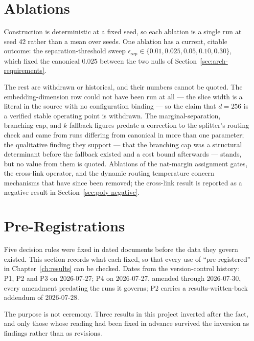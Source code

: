 \section{Ablations}\label{sec:appendix-ablations}

Construction is deterministic at a fixed seed, so each ablation is a single run
at seed 42 rather than a mean over seeds. One ablation has a current, citable
outcome: the separation-threshold sweep
$\epsilon_{\text{sep}} \in \{0.01, 0.025, 0.05, 0.10, 0.30\}$, which fixed the
canonical $0.025$ between the two nulls of
Section~\ref{sec:arch-requirements}.

The rest are withdrawn or historical, and their numbers cannot be quoted. The
embedding-dimension row could not have been run at all --- the slice width is
a literal in the source with no configuration binding --- so the claim that
$d = 256$ is a verified stable operating point is withdrawn. The
marginal-separation, branching-cap, and $k$-fallback figures predate a
correction to the splitter's routing check and came from runs differing from
canonical in more than one parameter; the qualitative finding they support ---
that the branching cap was a structural determinant before the fallback
existed and a cost bound afterwards --- stands, but no value from them is
quoted. Ablations of the nat-margin assignment gates, the cross-link operator,
and the dynamic routing temperature concern mechanisms that have since been
removed; the cross-link result is reported as a negative result in
Section~\ref{sec:poly-negative}.

\section{Pre-Registrations}\label{app:preregs}

Five decision rules were fixed in dated documents before the data they govern
existed. This section records what each fixed, so that every use of
``pre-registered'' in Chapter~\ref{ch:results} can be checked. Dates from the
version-control history: P1, P2 and P3 on 2026-07-27; P4 on 2026-07-27, amended
through 2026-07-30, every amendment predating the runs it governs; P2 carries a
results-written-back addendum of 2026-07-28.

The purpose is not ceremony. Three results in this project inverted after the
fact, and only those whose reading had been fixed in advance survived the
inversion as findings rather than as revisions.

